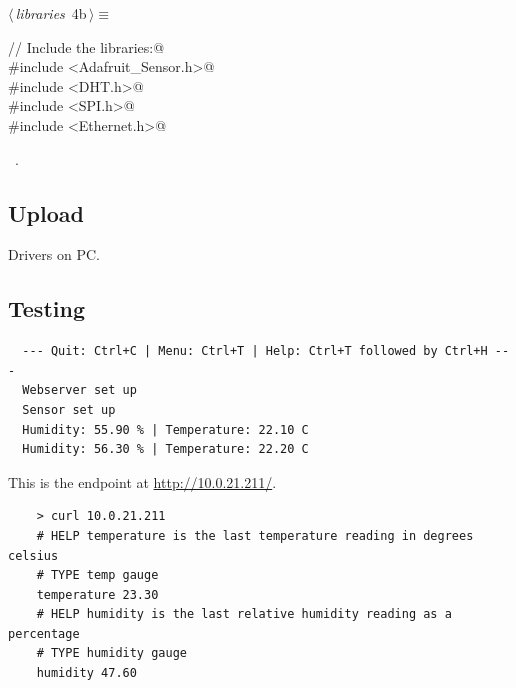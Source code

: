 \documentclass[a4paper, 12pt]{article}
\begin{document}
\begin{flushleft} \small
\begin{minipage}{\linewidth}\label{scrap3}\raggedright\small
{}$\langle\,${\itshape libraries}\nobreak\ {\footnotesize{4b}}$\,\rangle\equiv$
\vspace{-1ex}
\begin{list}{}{\setlength{\leftmargin}{1em}} \item
\mbox{}\verb@// Include the libraries:@\\
\mbox{}\verb@#include <Adafruit_Sensor.h>@\\
\mbox{}\verb@#include <DHT.h>@\\
\mbox{}\verb@#include <SPI.h>@\\
\mbox{}\verb@#include <Ethernet.h>@\\
\mbox{}{\NWsep}
\end{list}
\vspace{-1ex}
\vspace{-1ex}
\footnotesize
\begin{list}{}{\setlength{\itemsep}{-\parsep}\setlength{\itemindent}{-\leftmargin}}
\item \NWtxtMacroRefIn\ .
\end{list}
\end{minipage}
\end{flushleft}


\subsection{Upload}

Drivers on PC.



\subsection{Testing}

\begin{verbatim}
  --- Quit: Ctrl+C | Menu: Ctrl+T | Help: Ctrl+T followed by Ctrl+H ---
  Webserver set up
  Sensor set up
  Humidity: 55.90 % | Temperature: 22.10 C
  Humidity: 56.30 % | Temperature: 22.20 C
  \end{verbatim}
  
  This is the endpoint at \url{http://10.0.21.211/}.
  
  \begin{verbatim}
    > curl 10.0.21.211
    # HELP temperature is the last temperature reading in degrees celsius
    # TYPE temp gauge
    temperature 23.30
    # HELP humidity is the last relative humidity reading as a percentage
    # TYPE humidity gauge
    humidity 47.60
  \end{verbatim}
\end{document}
